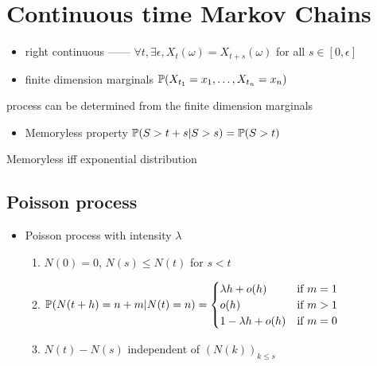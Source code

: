 \section{Continuous time Markov Chains}\label{sec:continous-time-markov-chains}

\begin{itemize}
    \item right continuous ------ $\forall t, \exists \epsilon, X_t(\omega) = X_{t+s}(\omega)$ for all $s \in [0, \epsilon]$
    \item finite dimension marginals $\mathbb{P}(X_{t_1} = x_1, \dots, X_{t_n} = x_n)$
\end{itemize}

\begin{fact}
    process can be determined from the finite dimension marginals
\end{fact}
\begin{itemize}
    \item Memoryless property $\mathbb{P}(S > t+s | S > s) = \mathbb{P}(S > t)$
\end{itemize}

\begin{thm}
    Memoryless iff exponential distribution
\end{thm}

\subsection{Poisson process}\label{subsec:poisson-process}

\begin{itemize}
    \item Poisson process with intensity $\lambda$
    \begin{enumerate}
        \item $N(0) = 0$, $N(s) \leq N(t)$ for $s < t$
        \item $\mathbb{P}(N(t + h) = n + m| N(t) = n) = \begin{cases}
                                                     \lambda h + o(h) & \text{if } m = 1\\
                                                     o(h) & \text{if } m > 1\\
                                                     1 - \lambda h + o(h) & \text{if } m = 0\\
        \end{cases}$
        \item $N(t) - N(s)$ independent of $(N(k))_{k \leq s}$
    \end{enumerate}
\end{itemize}

